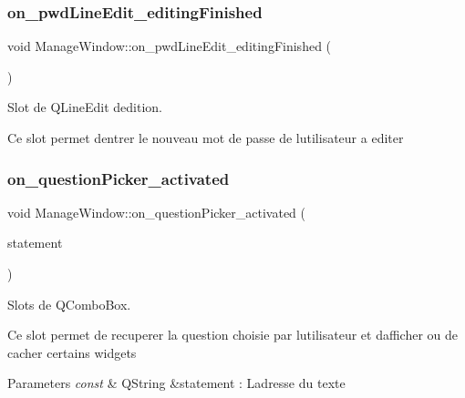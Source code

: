 \subsubsection{\texorpdfstring{on\+\_\+pwd\+Line\+Edit\+\_\+editing\+Finished}{on\_pwdLineEdit\_editingFinished}}
{\footnotesize\ttfamily void Manage\+Window\+::on\+\_\+pwd\+Line\+Edit\+\_\+editing\+Finished (\begin{DoxyParamCaption}{ }\end{DoxyParamCaption})\hspace{0.3cm}{\ttfamily [slot]}}



Slot de Q\+Line\+Edit d\textquotesingle{}edition. 

Ce slot permet d\textquotesingle{}entrer le nouveau mot de passe de l\textquotesingle{}utilisateur a editer \mbox{\label{classManageWindow_aebb1e761d8f734bd825bf07926b82bd1}} 
\subsubsection{\texorpdfstring{on\+\_\+question\+Picker\+\_\+activated}{on\_questionPicker\_activated}}
{\footnotesize\ttfamily void Manage\+Window\+::on\+\_\+question\+Picker\+\_\+activated (\begin{DoxyParamCaption}\item[{const Q\+String \&}]{statement }\end{DoxyParamCaption})\hspace{0.3cm}{\ttfamily [slot]}}



Slots de Q\+Combo\+Box. 

Ce slot permet de recuperer la question choisie par l\textquotesingle{}utilisateur et d\textquotesingle{}afficher ou de cacher certains widgets 
\begin{DoxyParams}{Parameters}
{\em const} & Q\+String \&statement \+: L\textquotesingle{}adresse du texte \\
\hline
\end{DoxyParams}
\mbox{\label{classManageWindow_ab2651b6595618b6c1c1789328d47cd35}} 
